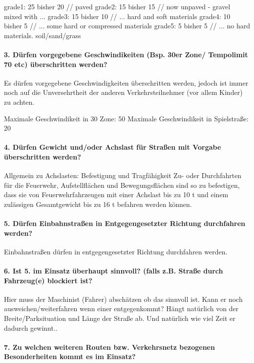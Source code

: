 \documentclass[12pt,a4paper]{article}
\begin{document}
grade1: 25 bisher 20     // paved
grade2: 15 bisher 15     // now unpaved - gravel mixed with ...
grade3: 15 bisher 10     // ... hard and soft materials
grade4: 10 bisher 5     // ... some hard or compressed materials
grade5: 5 bisher 5     // ... no hard materials. soil/sand/grass
\paragraph*{3. Dürfen vorgegebene Geschwindikeiten (Bsp. 30er Zone/ Tempolimit 70 etc) überschritten werden?}

Es dürfen vorgegebene Geschwindigkeiten überschritten werden, jedoch ist immer noch auf die Unversehrtheit der anderen Verkehrsteilnehmer (vor allem Kinder) zu achten.

Maximale Geschwindikeit in 30 Zone: 50
Maximale Geschwindikeit in Spielstraße: 20

\paragraph*{4. Dürfen Gewicht und/oder Achslast für Straßen mit Vorgabe überschritten werden?}

Allgemein zu Achslasten: Befestigung und Tragfähigkeit Zu- oder Durchfahrten für die Feuerwehr, Aufstellflächen und Bewegungsflächen sind so zu befestigen, dass sie von Feuerwehrfahrzeugen mit einer Achslast bis zu 10 t und einem zulässigen Gesamtgewicht bis zu 16 t befahren werden können.

\paragraph*{5. Dürfen Einbahnstraßen in Entgegengesetzter Richtung durchfahren werden?}

Einbahnstraßen dürfen in entgegengesetzter Richtung durchfahren werden.

\paragraph*{6. Ist 5. im Einsatz überhaupt sinnvoll? (falls z.B. Straße durch Fahrzeug(e) blockiert ist?}

Hier muss der Maschinist (Fahrer) abschätzen ob das sinnvoll ist. Kann er noch ausweichen/weiterfahren wenn einer entgegenkommt? Hängt natürlich von der Breite/Parksituation und Länge der Straße ab. Und natürlich wie viel Zeit er dadurch gewinnt..

\paragraph*{7. Zu welchen weiteren Routen bzw. Verkehrsnetz bezogenen Besonderheiten kommt es im Einsatz?}
\end{document}
